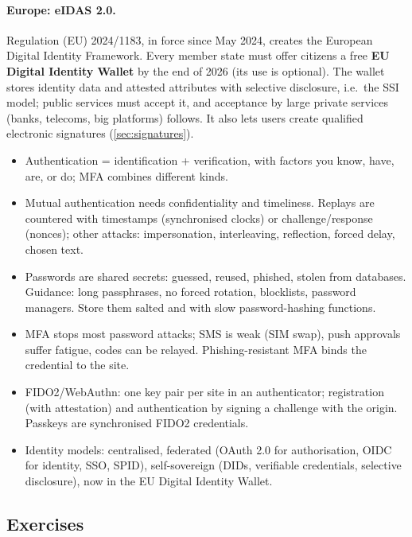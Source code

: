 \paragraph{Europe: eIDAS 2.0.} Regulation (EU) 2024/1183, in force since May 2024, creates the European Digital Identity Framework. Every member state must offer citizens a free \textbf{EU Digital Identity Wallet} by the end of 2026 (its use is optional). The wallet stores identity data and attested attributes with selective disclosure, i.e.\ the SSI model; public services must accept it, and acceptance by large private services (banks, telecoms, big platforms) follows. It also lets users create qualified electronic signatures (\cref{sec:signatures}).

\begin{summary}
\begin{itemize}
    \item Authentication = identification + verification, with factors you know, have, are, or do; MFA combines different kinds.
    \item Mutual authentication needs confidentiality and timeliness. Replays are countered with timestamps (synchronised clocks) or challenge/response (nonces); other attacks: impersonation, interleaving, reflection, forced delay, chosen text.
    \item Passwords are shared secrets: guessed, reused, phished, stolen from databases. Guidance: long passphrases, no forced rotation, blocklists, password managers. Store them salted and with slow password-hashing functions.
    \item MFA stops most password attacks; SMS is weak (SIM swap), push approvals suffer fatigue, codes can be relayed. Phishing-resistant MFA binds the credential to the site.
    \item FIDO2/WebAuthn: one key pair per site in an authenticator; registration (with attestation) and authentication by signing a challenge with the origin. Passkeys are synchronised FIDO2 credentials.
    \item Identity models: centralised, federated (OAuth 2.0 for authorisation, OIDC for identity, SSO, SPID), self-sovereign (DIDs, verifiable credentials, selective disclosure), now in the EU Digital Identity Wallet.
\end{itemize}
\end{summary}

\subsection*{Exercises}

